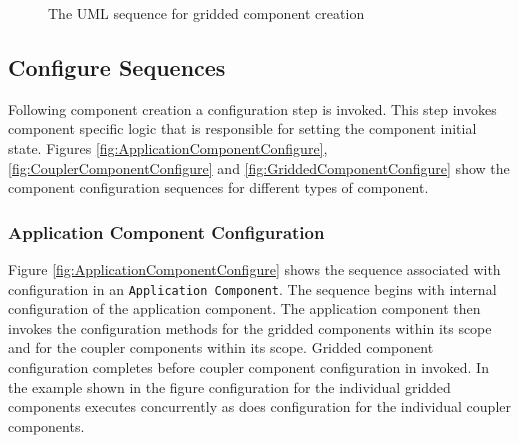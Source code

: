 \begin{figure}
\caption[{Gridded Component Create}]
{The UML sequence for gridded component creation}
\begin{center}
\label{fig:GriddedComponentCreate}
\end{center}
\end{figure}

\subsection{Configure Sequences}
Following component creation a configuration step is invoked. This step
invokes component specific logic that is responsible for setting the component
initial state. Figures \ref{fig:ApplicationComponentConfigure}, 
\ref{fig:CouplerComponentConfigure} and 
\ref{fig:GriddedComponentConfigure} show the component
configuration sequences for different types of component.

\subsubsection{Application Component Configuration}
Figure \ref{fig:ApplicationComponentConfigure} shows the sequence associated 
with configuration in an {\tt Application Component}. The sequence begins 
with internal configuration of the application component. The application
component then invokes the configuration methods for the gridded components
within its scope and for the coupler components within its scope.
Gridded component configuration completes before coupler component
configuration in invoked. In the example shown in the figure configuration
for the individual gridded components executes concurrently as does 
configuration for the individual coupler components.


